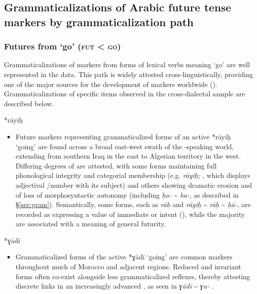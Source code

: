 \documentclass[output=paper]{langsci/langscibook}
\begin{document}
\subsection{Grammaticalizations of Arabic future tense markers by grammaticalization path}\label{sec:fut}
\subsubsection{ Futures from ‘go’ (\textsc{fut} < \textsc{go})}

Grammaticalizations of   markers from forms of lexical verbs meaning ‘go’ are well represented in the  data. This  path is widely attested cross-linguistically, providing one of the major sources for the development of   markers worldwide (\citealt{Bybee1994,HeineKuteva2002}). Grammaticalizations of specific items observed in the cross-dialectal  sample are described below.

*rāyiḥ

\begin{itemize}

  \item[]
Future markers representing grammaticalized forms of an active  *rāyiḥ ‘going’ are found across a broad east-west swath of the -speaking world, extending from southern Iraq in the east to Algerian territory in the west. Differing degrees of  are attested, with some forms maintaining full phonological integrity and categorial membership (e.g.  \textit{rāyiḥ;} \citealt{Mahdi1985}, which displays adjectival /number  with its subject) and others showing dramatic erosion and of loss of morphosyntactic autonomy (including  \textit{ḥa-} {\textasciitilde} \textit{ha-}, as described in §\ref{sec:gram}). Semantically, some forms, such as  \textit{rāḥ} and  \textit{rāyiḥ} {\textasciitilde} \textit{rāḥ} {\textasciitilde} \textit{ḥā-}, are recorded as expressing a value of immediate  or  intent (\citealt{Boucherit2011,Rosenhouse2011}), while the majority are associated with a meaning of general futurity.
\end{itemize}
 
*ɣādī

\begin{itemize}

  \item[]
Grammaticalized forms of the active  *ɣādī ‘going’ are common  markers throughout much of Morocco and adjacent regions. Reduced and invariant forms often co-exist alongside less grammaticalized reflexes, thereby attesting discrete links in an increasingly advanced , as seen in  \textit{ɣādī} {\textasciitilde} \textit{ɣa-} \citep{Caubet2011}.
\end{itemize}
 
\end{document}
